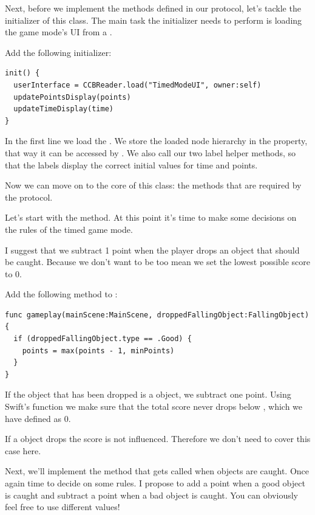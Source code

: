 Next, before we implement the methods defined in our protocol, let's tackle the
initializer of this class. The main task the initializer needs to perform is
loading the game mode's UI from a \ccbfile{}.
\begin{leftbar}
Add the following initializer:
\begin{lstlisting}
init() {
  userInterface = CCBReader.load("TimedModeUI", owner:self)
  updatePointsDisplay(points)
  updateTimeDisplay(time)
}
\end{lstlisting}
\end{leftbar}
In the first line we load the  \ccbfile{}. We store the
loaded node hierarchy in the  property, that way it
can be accessed by .
We also call our two label helper methods, so that the labels display the
correct initial values for time and points.

Now we can move on to the core of this class: the methods that are required by
the  protocol.

Let's start with the  method. At this point it's time to make some
decisions on the rules of the timed game mode. 

I suggest that we subtract 1 point when the player
drops an object that should be caught. Because we don't want to be too mean we
set the lowest possible score to 0.

\begin{leftbar}
Add the following method to :
\begin{lstlisting}
func gameplay(mainScene:MainScene, droppedFallingObject:FallingObject) {
  if (droppedFallingObject.type == .Good) {
    points = max(points - 1, minPoints)
  }
}
\end{lstlisting}
\end{leftbar}
If the object that has been dropped is a  object, we subtract
one point. Using Swift's  function we make sure that the total
score never drops below , which we have defined as 0.

If a  object drops the score is not influenced. Therefore we
don't need to cover this case here.

Next, we'll implement the method that gets called when objects are caught.
Once again time to decide on some rules. I propose to add a point when a good
object is caught and subtract a point when a bad object is caught. You can
obviously feel free to use different values!

